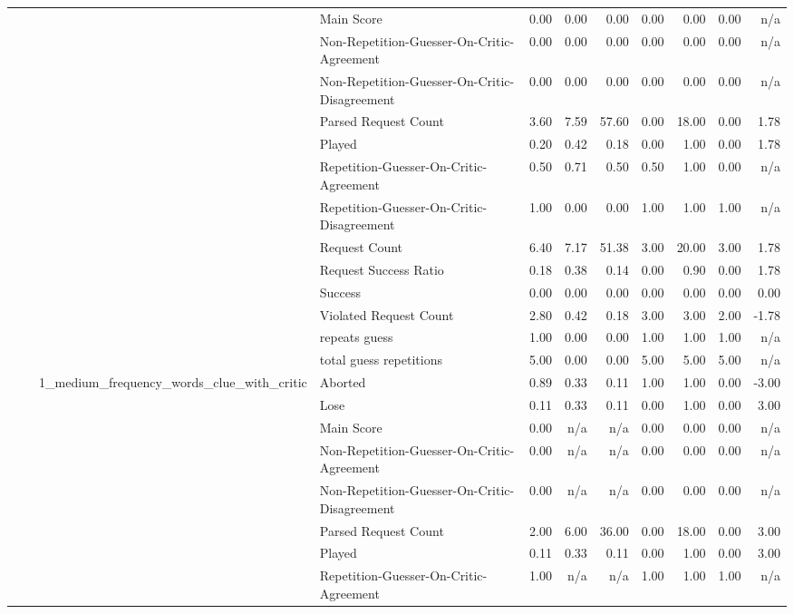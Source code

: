\begin{tabular}{llllrrrrrrr}
 &  &  & Main Score & 0.00 & 0.00 & 0.00 & 0.00 & 0.00 & 0.00 & n/a \\
 &  &  & Non-Repetition-Guesser-On-Critic-Agreement & 0.00 & 0.00 & 0.00 & 0.00 & 0.00 & 0.00 & n/a \\
 &  &  & Non-Repetition-Guesser-On-Critic-Disagreement & 0.00 & 0.00 & 0.00 & 0.00 & 0.00 & 0.00 & n/a \\
 &  &  & Parsed Request Count & 3.60 & 7.59 & 57.60 & 0.00 & 18.00 & 0.00 & 1.78 \\
 &  &  & Played & 0.20 & 0.42 & 0.18 & 0.00 & 1.00 & 0.00 & 1.78 \\
 &  &  & Repetition-Guesser-On-Critic-Agreement & 0.50 & 0.71 & 0.50 & 0.50 & 1.00 & 0.00 & n/a \\
 &  &  & Repetition-Guesser-On-Critic-Disagreement & 1.00 & 0.00 & 0.00 & 1.00 & 1.00 & 1.00 & n/a \\
 &  &  & Request Count & 6.40 & 7.17 & 51.38 & 3.00 & 20.00 & 3.00 & 1.78 \\
 &  &  & Request Success Ratio & 0.18 & 0.38 & 0.14 & 0.00 & 0.90 & 0.00 & 1.78 \\
 &  &  & Success & 0.00 & 0.00 & 0.00 & 0.00 & 0.00 & 0.00 & 0.00 \\
 &  &  & Violated Request Count & 2.80 & 0.42 & 0.18 & 3.00 & 3.00 & 2.00 & -1.78 \\
 &  &  & repeats guess & 1.00 & 0.00 & 0.00 & 1.00 & 1.00 & 1.00 & n/a \\
 &  &  & total guess repetitions & 5.00 & 0.00 & 0.00 & 5.00 & 5.00 & 5.00 & n/a \\
\cline{3-11}
 &  & \multirow[t]{15}{*}{1_medium_frequency_words_clue_with_critic} & Aborted & 0.89 & 0.33 & 0.11 & 1.00 & 1.00 & 0.00 & -3.00 \\
 &  &  & Lose & 0.11 & 0.33 & 0.11 & 0.00 & 1.00 & 0.00 & 3.00 \\
 &  &  & Main Score & 0.00 & n/a & n/a & 0.00 & 0.00 & 0.00 & n/a \\
 &  &  & Non-Repetition-Guesser-On-Critic-Agreement & 0.00 & n/a & n/a & 0.00 & 0.00 & 0.00 & n/a \\
 &  &  & Non-Repetition-Guesser-On-Critic-Disagreement & 0.00 & n/a & n/a & 0.00 & 0.00 & 0.00 & n/a \\
 &  &  & Parsed Request Count & 2.00 & 6.00 & 36.00 & 0.00 & 18.00 & 0.00 & 3.00 \\
 &  &  & Played & 0.11 & 0.33 & 0.11 & 0.00 & 1.00 & 0.00 & 3.00 \\
 &  &  & Repetition-Guesser-On-Critic-Agreement & 1.00 & n/a & n/a & 1.00 & 1.00 & 1.00 & n/a \\

\end{tabular}

